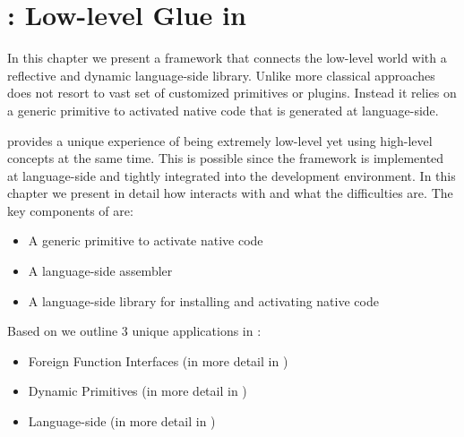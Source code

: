 
\chapter{\B: Low-level Glue in \PH}
\minitoc
\introduction

In this chapter we present \B a framework that connects the low-level \VM world with a reflective and dynamic language-side library.
Unlike more classical approaches \B does not resort to vast set of customized \VM primitives or plugins.
Instead it relies on a generic primitive to activated native code that is generated at language-side.

\B provides a unique experience of being extremely low-level yet using high-level concepts at the same time.
This is possible since the framework is implemented at language-side and tightly integrated into the \PH development environment.
In this chapter we present in detail how \B interacts with \PH and what the difficulties are.
The key components of \B are:
\begin{itemize}[noitemsep]
	\item A generic primitive to activate native code
	\item \AsmJIT A language-side assembler
	\item A language-side library for installing and activating native code
\end{itemize}

\noindent Based on \B we outline 3 unique applications in :
\begin{itemize}[noitemsep]
	\item Foreign Function Interfaces (in more detail in )
	\item Dynamic Primitives (in more detail in  )
	\item Language-side \JIT (in more detail in  )
\end{itemize}


\newpage
